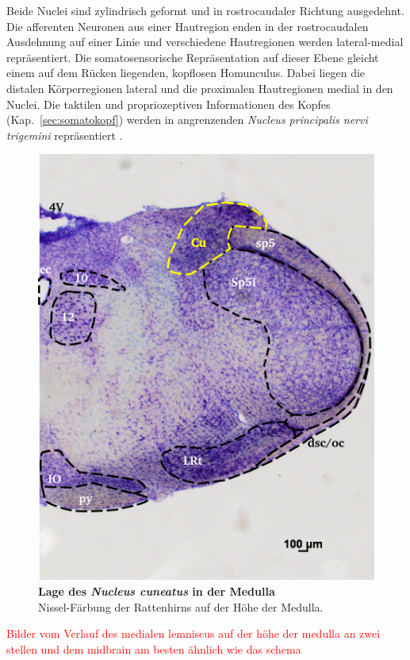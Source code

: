 \documentclass[12pt,a4paper,pdftex]{article}
\begin{document}
Beide Nuclei sind zylindrisch geformt und in rostrocaudaler Richtung ausgedehnt. Die afferenten Neuronen aus einer Hautregion enden in der rostrocaudalen Ausdehnung auf einer Linie und verschiedene Hautregionen werden lateral-medial repräsentiert. Die somatosensorische Repräsentation auf dieser Ebene gleicht einem auf dem Rücken liegenden, kopflosen Homunculus. Dabei liegen die distalen Körperregionen lateral und die proximalen Hautregionen medial in den Nuclei. Die taktilen und propriozeptiven Informationen des Kopfes (Kap.~\ref{sec:somatokopf}) werden in angrenzenden \textit{Nucleus principalis nervi trigemini} repräsentiert \cite[Kap.~22]{kandel2013principles}. 
\\
\begin{figure}[H]
    \centering
    \includegraphics{pictures/somatosensory/nucleus_cuneatus.png}
    \caption[Lage des \textit{Nucleus cuneatus} in der Medulla]{\textbf{Lage des \textit{Nucleus cuneatus} in der Medulla}\\
    Nissel-Färbung der Rattenhirns auf der Höhe der Medulla. }
    \label{fig:nucleus_cuneatus}
\end{figure}
\textcolor{red}{Bilder vom Verlauf des medialen lemniscus auf der höhe der medulla an zwei stellen und dem midbrain am besten ähnlich wie das schema}
\end{document}
